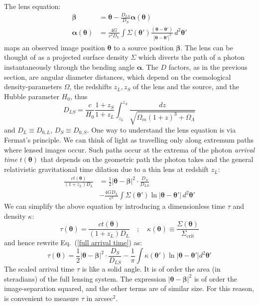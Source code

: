 \documentclass[galley,usenatbib]{mn2e}
\renewcommand{\vec}[1]{\ensuremath{\boldsymbol{#1}}}
\newcommand{\eqnref}[1] {Eq.~(\ref{#1})}
\begin{document}
The lens equation:
%
\begin{equation}
\begin{aligned}
    \vec\beta &= \vec\theta - \frac{D_{LS}}{D_S}\vec\alpha(\vec\theta) \\
\vec\alpha(\vec\theta) &= \frac{4G}{c^2D_L} \int \Sigma(\vec\theta')
                          \frac{(\vec\theta - \vec\theta')}
                          {\ |\vec\theta - \vec\theta'|^2} \, d^2\vec\theta'
\end{aligned}
\label{eqn:lens_equation}
\end{equation}
%
maps an observed image position $\vec\theta$ to a source position
$\vec\beta$.  The lens can be thought of as a projected surface
density $\Sigma$ which diverts the path of a photon instantaneously
through the bending angle $\vec\alpha$.  The $D$ factors, as in the
previous section, are angular diameter distances, which depend on the
cosmological density-parameters $\Omega$, the redshifts $z_L,z_S$ of
the lens and the source, and the Hubble parameter $H_0$, thus
%
\begin{equation}
D_{LS} = \frac c{H_0} \frac{1+z_S}{1+z_L} \int_{z_L}^{z_S}
                      \frac{dz}{\sqrt{\Omega_m(1+z)^3 + \Omega_\Lambda}}
\end{equation}
%
and $D_L \equiv D_{0,L}$, $D_S \equiv D_{0,S}$.  One way to understand the lens
equation is via Fermat's principle. We can think of light as travelling only
along extremum paths where lensed images occur.  Such paths occur at the
extrema of the photon {\it arrival time} $t(\vec\theta)$ that depends on the
geometric path the photon takes and the general relativistic gravitational time
dilation due to a thin lens at redshift $z_L$:
%
\begin{equation}
\begin{aligned}
\frac{ct(\vec\theta)}{(1+z_L)D_{L}}
&= {\textstyle\frac12} |\vec\theta - \vec\beta|^2
   \cdot \frac{D_{S}}{D_{LS}} \\
&- \frac{4GD_L}{c^2}
   \int \Sigma(\vec\theta') \ln |\vec\theta-\vec\theta'| \, d^2\vec\theta'
\label{full arrival time}
\end{aligned}
\end{equation}
%
We can simplify the above equation by introducing a dimensionless time $\tau$
and density $\kappa$: 
%
\begin{equation}
\tau(\vec\theta) = \frac{ct(\vec\theta)}{(1+z_L)D_{L}} \quad ; \quad 
\kappa(\vec\theta) \equiv \frac{\Sigma(\vec\theta)}{\Sigma_\mathrm{crit}}
\end{equation}
%
and hence rewrite \eqnref{full arrival time} as:
%
\begin{equation}
\tau(\vec\theta) = {\textstyle\frac12} |\vec\theta - \vec\beta|^2
                   \cdot \frac{D_{S}}{D_{LS}}
                 - \frac1\pi \int \kappa (\vec\theta')
                   \ln|\vec\theta - \vec\theta'| d^2\vec\theta'
\label{arrival time}
\end{equation}
%
The scaled arrival time $\tau$ is like a solid angle. It is of order the area
(in steradians) of the full lensing system. The expression $|\vec\theta -
\vec\beta|^2$ is of order the image-separation squared, and the other terms are
of similar size.  For this reason, is convenient to measure $\tau$ in
arcsec$^{2}$.
\end{document}
